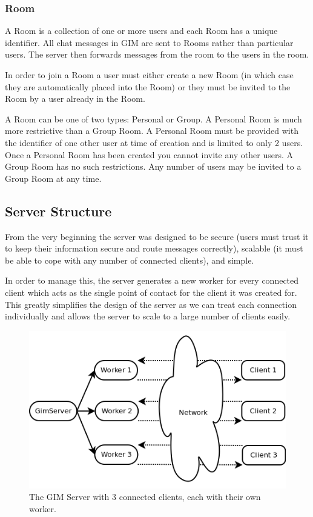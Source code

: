 \subsubsection{Room}
A Room is a collection of one or more users and each Room has a unique identifier. All chat messages in GIM are sent to Rooms rather than particular users. The server then forwards messages from the room to the users in the room.

In order to join a Room a user must either create a new Room (in which case they are automatically placed into the Room) or they must be invited to the Room by a user already in the Room. 

A Room can be one of two types: Personal or Group. A Personal Room is much more restrictive than a Group Room. A Personal Room must be provided with the identifier of one other user at time of creation and is limited to only 2 users. Once a Personal Room has been created you cannot invite any other users. A Group Room has no such restrictions. Any number of users may be invited to a Group Room at any time.

\subsection{Server Structure}

From the very beginning the server was designed to be secure (users must trust it to keep their information secure and route messages correctly), scalable (it must be able to cope with any number of connected clients), and simple. 

In order to manage this, the server generates a new worker for every connected client which acts as the single point of contact for the client it was created for. This greatly simplifies the design of the server as we can treat each connection individually and allows the server to scale to a large number of clients easily.

\begin{figure}[!h]
    \begin{center}
        \includegraphics[scale=0.75]{chapter2/diagrams/server_workers.png}
        \caption{The GIM Server with 3 connected clients, each with their own worker.}
        \label{WorkersDia}
    \end{center}
\end{figure}


